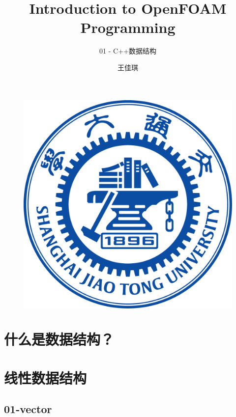 \documentclass{beamer}
\author{{王佳琪}}
\title{Introduction to OpenFOAM Programming}
\subtitle{01 - C++数据结构}
\institute{\kaishu{上海交通大学}}
\date{\kaishu{2022年1月}}
\begin{document}
\songti
\begin{frame}
    \titlepage
    \begin{figure}[htpb]
        \begin{center}
            \includegraphics[width=0.15\linewidth]{pic/WUT.png}
        \end{center}
    \end{figure}
\end{frame}

\begin{frame}
    \tableofcontents[sectionstyle=show,subsectionstyle=show/shaded/hide,subsubsectionstyle=show/shaded/hide]
\end{frame}






\section{什么是数据结构？}










\section{线性数据结构}
\subsection{01-vector}


























\end{document}
